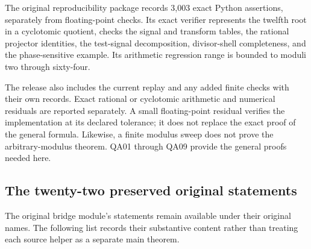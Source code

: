 The original reproducibility package records 3,003 exact Python
assertions, separately from floating-point checks. Its exact verifier
represents the twelfth root in a cyclotomic quotient, checks the signal
and transform tables, the rational projector identities, the test-signal
decomposition, divisor-shell completeness, and the phase-sensitive
example. Its arithmetic regression range is bounded to moduli two
through sixty-four.

The release also includes the current replay and any added finite checks
with their own records. Exact rational or cyclotomic arithmetic and
numerical residuals are reported separately. A small floating-point
residual verifies the implementation at its declared tolerance; it does
not replace the exact proof of the general formula. Likewise, a finite
modulus sweep does not prove the arbitrary-modulus theorem. QA01 through
QA09 provide the general proofs needed here.

\hypertarget{q:the-twenty-two-preserved-original-statements}{%
\subsection{The twenty-two preserved original
statements}\label{q:the-twenty-two-preserved-original-statements}}

The original bridge module's statements remain available under their
original names. The following list records their substantive content
rather than treating each source helper as a separate main theorem.

